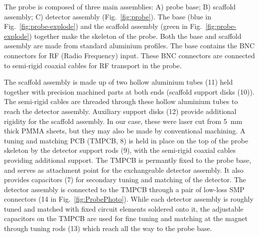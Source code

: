 \documentclass[preprint,5p]{elsarticle}
\newcommand{\fig}[1]{Fig.~\ref{#1}}
\begin{document}
The probe is composed of three main assemblies: A) probe base; B) scaffold assembly; 
C) detector assembly (\fig{fig:probe}). 
The  base (blue in \fig{fig:probe-explode}) and the scaffold assembly 
(green in \fig{fig:probe-explode}) together make the skeleton of the probe. 
Both the base and scaffold assembly are made from standard aluminium profiles. 
The base contains the BNC connectors for RF (Radio Frequency) input. 
These BNC connectors are connected to semi-rigid coaxial cables for 
RF transport in the probe.

The scaffold assembly is made up of two hollow aluminium tubes (11) held together with 
precision machined parts at both ends (scaffold support disks (10)). 
The semi-rigid cables are  threaded through these hollow aluminium tubes 
to reach the detector assembly. 
Auxiliary support disks (12) provide additional rigidity for the scaffold assembly. 
In our case, these were laser cut from 5~mm thick PMMA sheets, 
but they may also be made by conventional machining.
A tuning and matching PCB (TMPCB, 8) is held in place on the top of the probe skeleton by
the detector support rods (9), with the semi-rigid coaxial cables providing
additional support.
The TMPCB is permantly fixed to the probe base, and serves as attachment point
for the exchangeable detector assembly. It also provides 
capacitors (7) for secondary tuning and matching of the detector.
The detector assembly is connected to the TMPCB through a pair of
low-loss SMP connectors (14 in \fig{fig:ProbePhoto}).
While each detector assembly is roughly
tuned and matched with fixed circuit elements soldered onto it,
the adjustable capacitors on the TMPCB are used for 
fine tuning and matching 
at the magnet through tuning rods (13) which reach all the way to the probe base. 
\end{document}
